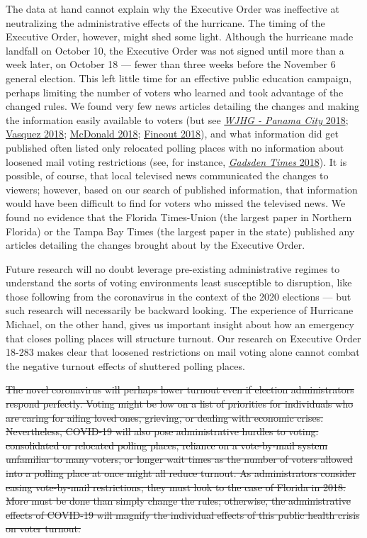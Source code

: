 \documentclass[
  12pt,
]{article}
\begin{document}
The data at hand cannot explain why the Executive Order was ineffective at neutralizing the administrative effects of the hurricane. The timing of the Executive Order, however, might shed some light. Although the hurricane made landfall on October 10, the Executive Order was not signed until more than a week later, on October 18 --- fewer than three weeks before the November 6 general election. This left little time for an effective public education campaign, perhaps limiting the number of voters who learned and took advantage of the changed rules. We found very few news articles detailing the changes and making the information easily available to voters (but see \protect\hyperlink{ref-WJHG2018}{\emph{WJHG - Panama City} 2018}; \protect\hyperlink{ref-Vasquez2018}{Vasquez 2018}; \protect\hyperlink{ref-McDonald2018}{McDonald 2018}; \protect\hyperlink{ref-Fineout2018}{Fineout 2018}), and what information did get published often listed only relocated polling places with no information about loosened mail voting restrictions (see, for instance, \protect\hyperlink{ref-gadsdentimes2018}{\emph{Gadsden Times} 2018}). It is possible, of course, that local televised news communicated the changes to viewers; however, based on our search of published information, that information would have been difficult to find for voters who missed the televised news. We found no evidence that the Florida Times-Union (the largest paper in Northern Florida) or the Tampa Bay Times (the largest paper in the state) published any articles detailing the changes brought about by the Executive Order.

Future research will no doubt leverage pre-existing administrative regimes to understand the sorts of voting environments least susceptible to disruption, like those following from the coronavirus in the context of the 2020 elections --- but such research will necessarily be backward looking. The experience of Hurricane Michael, on the other hand, gives us important insight about how an emergency that closes polling places will structure turnout. Our research on Executive Order 18-283 makes clear that loosened restrictions on mail voting alone cannot combat the negative turnout effects of shuttered polling places.

\sout{The novel coronavirus will perhaps lower turnout even if election administrators respond perfectly. Voting might be low on a list of priorities for individuals who are caring for ailing loved ones, grieving, or dealing with economic crises. Nevertheless, COVID-19 will also pose administrative hurdles to voting: consolidated or relocated polling places, reliance on a vote-by-mail system unfamiliar to many voters, or longer wait times as the number of voters allowed into a polling place at once might all reduce turnout. As administrators consider easing vote-by-mail restrictions, they must look to the case of Florida in 2018. More must be done than simply change the rules; otherwise, the administrative effects of COVID-19 will magnify the individual effects of this public health crisis on voter turnout.}
\end{document}
